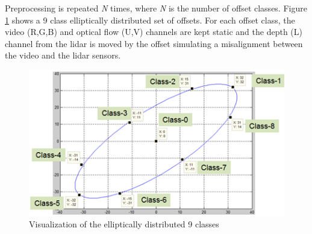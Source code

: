 \documentclass{article}
\begin{document}
%
%

Preprocessing is repeated \emph{N} times, where \emph{N} is the number of offset classes. Figure \ref{fig:Figures_Ellipse} shows a 9 class elliptically distributed set of offsets. For each offset class, the video (R,G,B) and optical flow (U,V) channels are kept static and the depth (L) channel from the lidar is moved by the offset simulating a misalignment between the video and the lidar sensors. 


\begin{figure}[htbp]
    \centering
        \includegraphics[scale=0.85]{Figures/ellipse.png}
    \caption{Visualization of the elliptically distributed 9 classes}
    \label{fig:Figures_Ellipse}
\end{figure}
\end{document}

